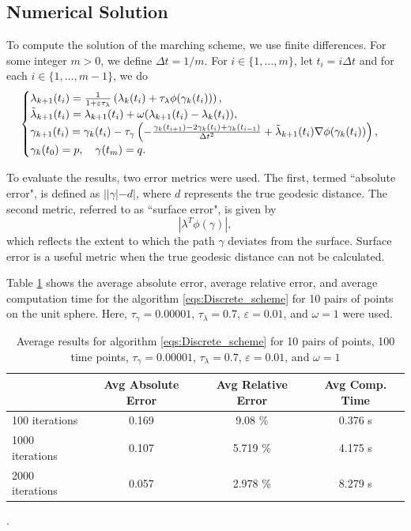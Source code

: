 \documentclass[12pt]{amsart}
\theoremstyle{definition}
\theoremstyle{remark}
\numberwithin{equation}{section}
\numberwithin{equation}{section}
\begin{document}
\subsection{Numerical Solution}
To compute the solution of the marching scheme, we use finite differences. For some integer $m>0$, we define $\Delta t= 1/m$. For $i\in \{1,\ldots, m\}$, let $t_i = i\Delta t$ and for each $i\in \{1,\ldots , m-1\}$, we do 
\begin{equation}\label{eqs:Discrete_scheme}
\begin{cases}
\lambda_{k+1}(t_i) = \frac{1}{1+\varepsilon\tau_{\lambda}}\left(\lambda_k(t_i)+\tau_{\lambda}\phi(\gamma_{k}(t_i))\right), \\
\Tilde{\lambda}_{k+1}(t_i) = \lambda_{k+1}(t_i) + \omega(\lambda_{k+1}(t_i) - \lambda_k(t_i)),\\
    \gamma_{k+1}(t_i) = \gamma_k(t_i)-\tau_{\gamma}\left(-\frac{\gamma_k(t_{i+1})-2\gamma_k(t_i)+\gamma_k(t_{i-1})}{\Delta t^2}+\Tilde{\lambda}_{k+1}(t_i)\nabla\phi(\gamma_k(t_i))\right), \\
    \gamma_k(t_0)=p, \quad \gamma(t_m)=q.
\end{cases}
\end{equation}


To evaluate the results, two error metrics were used. The first, termed ``absolute error",  is defined as $||\gamma| - d|$, where $d$ represents the true geodesic distance. The second metric,  
referred to as ``surface error",  is given by 
\[ 
|\lambda^T\phi(\gamma)|,
\]
which reflects the extent to which the path $\gamma$ deviates from the surface. Surface error is a useful metric when the true geodesic distance can not be calculated. 

Table \ref{tab:error} shows the average absolute error, average relative error, and average computation time for the algorithm \ref{eqs:Discrete_scheme} for 10 pairs of points on the unit sphere. Here, $\tau_{\gamma} = 0.00001$, $\tau_{\lambda} = 0.7$, $\varepsilon = 0.01$, and $\omega = 1$ were used. 

\begin{table}[H]
    \centering
        \begin{tabular}{|p{3.99cm}|ccc|}
        \hline
         & Avg Absolute Error & Avg Relative Error & Avg Comp. Time\\
         \hline
         100 iterations & 0.169  &  9.08 \%  &  0.376 s \\
         \hline
         1000 iterations & 0.107  &  5.719 \%  &  4.175 s \\
         \hline
         2000 iterations  & 0.057  &  2.978 \%  &  8.279 s \\
         \hline
    \end{tabular}
   \caption{Average results for algorithm \ref{eqs:Discrete_scheme} for 10 pairs of points, 100 time points, $\tau_{\gamma} = 0.00001$, $\tau_{\lambda} = 0.7$, $\varepsilon = 0.01$, and $\omega = 1$}. 
    \label{tab:error}
\end{table} 
\end{document}
